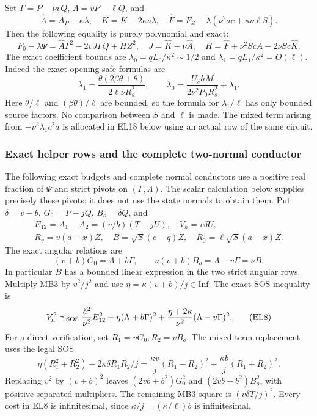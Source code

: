 Set $\Gamma=P-\nu vQ$, $\Lambda=vP-\ell Q$, and
\[
 \widehat A=A_P-\kappa\lambda,\quad
 \widehat K=K-2\kappa\nu\lambda,\quad
 \widehat F=F_Z-\lambda(\nu^2ac+\kappa\nu\ell S).
\]
Then the following equality is purely polynomial and exact:
\[
 F_0-\lambda\Psi
   =\widehat A\Gamma^2-2vJ\Gamma Q+HZ^2,
 \quad J=\widehat K-\nu\widehat A,
 \quad H=\widehat F+\nu^2Sc\widehat A-2\nu Sc\widehat K.
                                                               \tag{EL5}
\]
The exact coefficient bounds are
$\lambda_0=qL_0/\kappa^2\sim1/2$ and
$\lambda_1=qL_1/\kappa^2=O(\ell)$.
Indeed the exact opening-safe formulas are
\[
 \lambda_1=\frac{\theta(2\beta\theta+\theta)}
                    {2\ell\nu R_s^2},\qquad
 \lambda_0=\frac{U_shM}{2\nu^2P_0R_s^2}+\lambda_1.
\]
Here $\theta/\ell$ and $(\beta\theta)/\ell$ are bounded, so
the formula for $\lambda_1/\ell$ has only bounded source factors.
No comparison between $S$ and $\ell$ is made.  The mixed term
arising from $-\nu^2\lambda_1c^2a$ is allocated in EL18 below
using an actual row of the same circuit.

\subsubsection*{Exact helper rows and the complete two-normal conductor}
The following exact budgets and complete normal conductors use a
positive real fraction of $\Psi$ and strict pivots on
$(\Gamma,\Lambda)$.  The scalar calculation below supplies precisely
these pivots; it does not use the state normals to obtain them.
Put $\delta=v-b$, $G_0=P-jQ$, $B_o=\delta Q$, and
\[
\begin{gathered}
 E_{12}=A_1-A_2=(v/b)(T-jU),\quad V_h=v\delta U,\\
 R_v=v(a-x)Z,\quad B=\sqrt S(c-q)Z,\quad
 R_0=\ell\sqrt S(a-x)Z.
\end{gathered}
                                                               \tag{EL6}
\]
The exact angular relations are
\[
 (v+b)G_0=\Lambda+b\Gamma,\qquad
 \nu(v+b)B_o=\Lambda-v\Gamma=\nu B.             \tag{EL7}
\]
In particular $B$ has a bounded linear expression in the two strict
angular rows.  Multiply MB3 by $v^2/j^2$ and use
$\eta=\kappa(v+b)/j\in\mathrm{Inf}$.  The exact SOS inequality is
\[
 V_h^2\preceq_{\rm SOS}
  \frac{\delta^2}{\nu^2}E_{12}^2
   +\eta(\Lambda+b\Gamma)^2
   +\frac{\eta+2\kappa}{\nu^2}(\Lambda-v\Gamma)^2.
                                                               \tag{EL8}
\]
For a direct verification, set $R_1=vG_0,R_2=vB_o$.
The mixed-term replacement uses the legal SOS
\[
 \eta(R_1^2+R_2^2)-2\kappa\delta R_1R_2/j
 =\frac{\kappa v}{j}(R_1-R_2)^2
  +\frac{\kappa b}{j}(R_1+R_2)^2.
\]
Replacing $v^2$ by $(v+b)^2$ leaves
$(2vb+b^2)G_0^2$ and $(2vb+b^2)B_o^2$, with positive
separated multipliers.  The remaining MB3 square is
$(v\delta T/j)^2$.  Every cost in EL8 is infinitesimal, since
$\kappa/j=(\kappa/\ell)b$ is infinitesimal.

